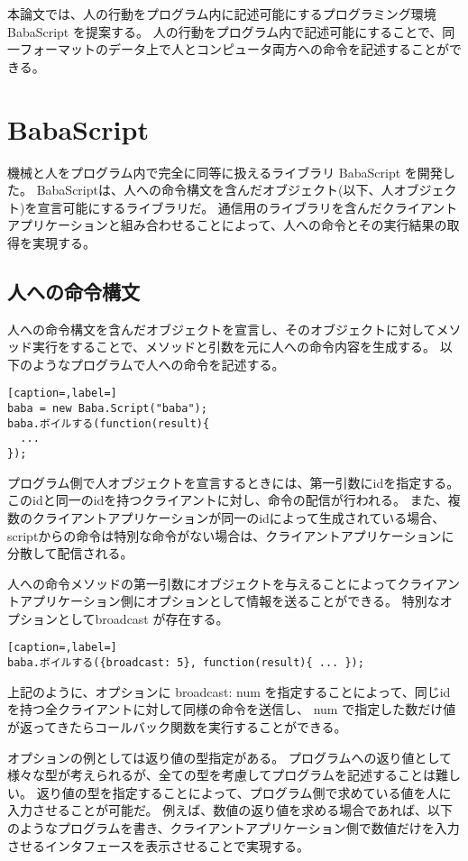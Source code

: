 \documentclass{deimj}
\begin{document}
本論文では、人の行動をプログラム内に記述可能にするプログラミング環境 BabaScript を提案する。
人の行動をプログラム内で記述可能にすることで、同一フォーマットのデータ上で人とコンピュータ両方への命令を記述することができる。

\section{BabaScript}

機械と人をプログラム内で完全に同等に扱えるライブラリ BabaScript を開発した。
BabaScriptは、人への命令構文を含んだオブジェクト(以下、人オブジェクト)を宣言可能にするライブラリだ。
通信用のライブラリを含んだクライアントアプリケーションと組み合わせることによって、人への命令とその実行結果の取得を実現する。

\subsection{人への命令構文}
人への命令構文を含んだオブジェクトを宣言し、そのオブジェクトに対してメソッド実行をすることで、メソッドと引数を元に人への命令内容を生成する。
以下のようなプログラムで人への命令を記述する。

\begin{lstlisting}[caption=,label=]
baba = new Baba.Script("baba");
baba.ボイルする(function(result){
  ...
});
\end{lstlisting}
プログラム側で人オブジェクトを宣言するときには、第一引数にidを指定する。
このidと同一のidを持つクライアントに対し、命令の配信が行われる。
また、複数のクライアントアプリケーションが同一のidによって生成されている場合、scriptからの命令は特別な命令がない場合は、クライアントアプリケーションに分散して配信される。


人への命令メソッドの第一引数にオブジェクトを与えることによってクライアントアプリケーション側にオプションとして情報を送ることができる。
特別なオプションとしてbroadcast が存在する。

\begin{lstlisting}[caption=,label=]
baba.ボイルする({broadcast: 5}, function(result){ ... });
\end{lstlisting}
  

上記のように、オプションに broadcast: num を指定することによって、同じidを持つ全クライアントに対して同様の命令を送信し、 num で指定した数だけ値が返ってきたらコールバック関数を実行することができる。

オプションの例としては返り値の型指定がある。
プログラムへの返り値として様々な型が考えられるが、全ての型を考慮してプログラムを記述することは難しい。
返り値の型を指定することによって、プログラム側で求めている値を人に入力させることが可能だ。
例えば、数値の返り値を求める場合であれば、以下のようなプログラムを書き、クライアントアプリケーション側で数値だけを入力させるインタフェースを表示させることで実現する。
\end{document}
